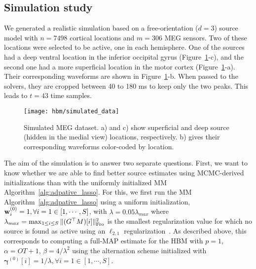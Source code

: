 \subsection{Simulation study}
We generated a realistic simulation based on a free-orientation ($d=3$) source model with $n=7498$ cortical locations and $m=306$ MEG sensors. Two of these locations were selected to be active, one in each hemisphere. One of the sources had a deep ventral location in the inferior occipital gyrus (Figure~\ref{fig:simulated_data}-c), and the second one had a more superficial location in the motor cortex (Figure~\ref{fig:simulated_data}-a). Their corresponding waveforms are shown in Figure~\ref{fig:simulated_data}-b. When passed to the solvers, they are cropped between 40 to 180 ms to keep only the two peaks. This leads to $t=43$ time samples.

\begin{figure}[htp]
	\centering
	\texttt{[image: hbm/simulated\_data]}%

	\caption{Simulated MEG dataset. a) and c) show superficial and deep source (hidden in the medial view) locations, respectively. b) gives their corresponding waveforms color-coded by location.}
	\label{fig:simulated_data}
\end{figure}

The aim of the simulation is to answer two separate questions. First, we want to know whether we are able to find better source estimates using MCMC-derived initializations than with the uniformly initialized MM Algorithm~\ref{alg:adpative_lasso}.
For this, we first run the MM Algorithm~\ref{alg:adpative_lasso} using a uniform initialization, \ie $\mathbf{w}^{(0)}_{i} = 1, \forall i=1\in [1,\cdots,S]$, with $\lambda = 0.05\lambda_{max}$ where $\lambda_{max}= \max_{1 \leq i \leq S} \|{(G^\top M)[i]}\|_{\rm Fro}^2$ is the smallest regularization value for which no source is found as active using an $\ell_{2,1}$ regularization~\cite{Ndiaye_Fercoq_Gramfort_Salmon15,strohmeier-etal:16}. As described above, this corresponds to computing a full-MAP estimate for the HBM with $p=1$, $\alpha = OT +1 $, $\beta = 4/\lambda^2$ using the alternation scheme \label{eq:AO-nu0-X} initialized with $\mathbf{\gamma}^{(0)}[i] = 1/\lambda, \forall i=1\in [1, \cdots, S]$.

